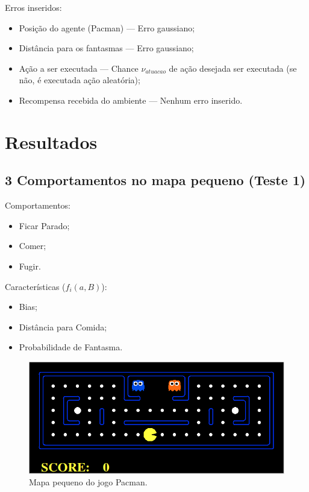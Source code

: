 \documentclass{beamer}
\begin{document}

\begin{frame}
Erros inseridos:\pause
\begin{itemize}
	\item Posição do agente (Pacman) --- Erro gaussiano;\pause
	\item Distância para os fantasmas --- Erro gaussiano;\pause
	\item Ação a ser executada --- Chance $ \nu_{atuacao} $ de ação desejada ser executada (se não, é executada ação aleatória);\pause
	\item Recompensa recebida do ambiente --- Nenhum erro inserido.
\end{itemize}
\end{frame}

\section{Resultados}

\subsection{3 Comportamentos no mapa pequeno (Teste 1)}

\begin{frame}
\begin{multicols}{2}
Comportamentos:
\begin{itemize}
	\item Ficar Parado;
	\item Comer;
	\item Fugir.
\end{itemize}

Características ($ f_i \left( a, B \right) $):
\begin{itemize}
	\item Bias;
	\item Distância para Comida;
	\item Probabilidade de Fantasma.
\end{itemize}

\end{multicols}

\begin{figure}[h]
    \centering
    \includegraphics[width=0.6\linewidth]{images/pacman_small_map}
    \caption{Mapa pequeno do jogo Pacman.}
    \label{img:PlataformaPacmanMapaPequeno}
\end{figure}
\end{frame}
\end{document}

